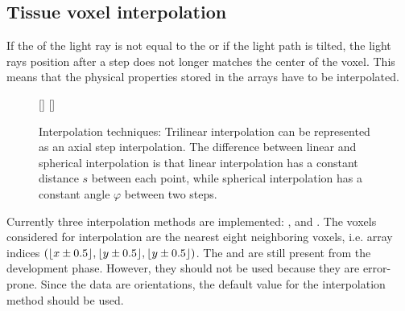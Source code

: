 \subsection{Tissue voxel interpolation}
%
If the \Stepsize{} of the light ray is not equal to the \Voxelsize{} or if the light path is tilted, the light rays position after a step does not longer matches the center of the voxel.
This means that the physical properties stored in the arrays have to be interpolated.
%
\begin{figure}[!t]
\centering
\setlength{\tikzwidth}{0.475\textwidth}
[\tikzwidth]{
\hfill{}\hfill}\hfill
{}
[\tikzwidth]{
}
\caption{Interpolation techniques: Trilinear interpolation can be represented as an axial step interpolation. The difference between linear and spherical interpolation is that linear interpolation has a constant distance $s$ between each point, while spherical interpolation has a constant angle $\varphi$ between two steps.}
\label{fig:vectorfield_disc}
\end{figure}
%
Currently three interpolation methods are implemented: ,  and .
The voxels considered for interpolation are the nearest eight neighboring voxels, i.e. array indices $(\lfloor x\pm0.5\rfloor,\lfloor y\pm0.5\rfloor,\lfloor y\pm0.5\rfloor)$.
The  and  are still present from the development phase.
However, they should not be used because they are error-prone.
Since the data are orientations, the default value for the interpolation method  should be used.
%
%
%
